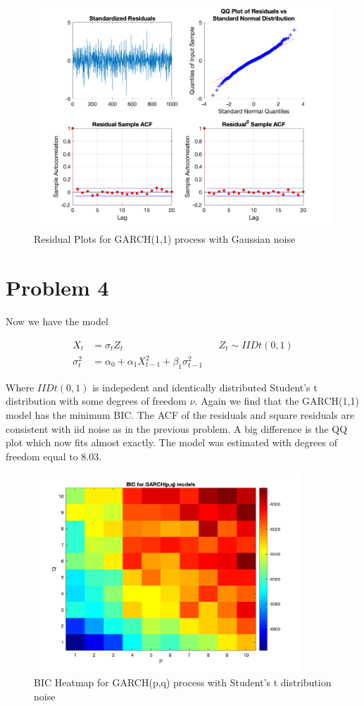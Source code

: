 \documentclass{article}
\begin{document}
\begin{figure}[H]
\includegraphics[width=16cm]{plots/residual_plots_norm.png}
\centering
\caption{Residual Plots for GARCH(1,1) process with Gaussian noise}
\label{fig:residual_plots_norm}
\end{figure}

\section*{Problem 4}

Now we have the model

\begin{align*}
X_t &= \sigma_t Z_t && Z_t \sim IIDt(0, 1)\\
\sigma_t^2 &= \alpha_0 + \alpha_1 X_{t - 1}^2 + \beta_1 \sigma_{t - 1}^2
\end{align*}

Where $IIDt(0,1)$ is indepedent and identically distributed Student's t distribution with some degrees of freedom $\nu$.
Again we find that the GARCH(1,1) model has the minimum BIC.
The ACF of the residuals and square residuals are consistent with iid noise as in the previous problem.
A big difference is the QQ plot which now fits almost exactly.
The model was estimated with degrees of freedom equal to 8.03.

\begin{figure}[H]
\includegraphics[width=10cm]{plots/bic_heatmap_t.png}
\centering
\caption{BIC Heatmap for GARCH(p,q) process with Student's t distribution noise}
\label{fig:bic_heatmap_t}
\end{figure}
\end{document}
